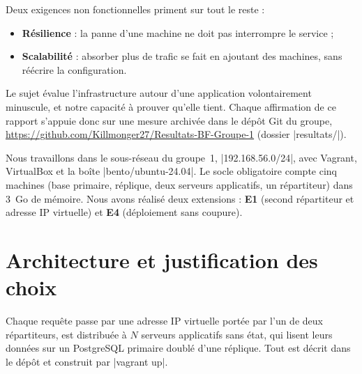 \documentclass[a4paper,11pt]{article}
\begin{document}
Deux exigences non fonctionnelles priment sur tout le reste :
\begin{itemize}
  \item \textbf{Résilience} : la panne d'une machine ne doit pas interrompre le service ;
  \item \textbf{Scalabilité} : absorber plus de trafic se fait en ajoutant des machines, sans réécrire la configuration.
\end{itemize}

Le sujet évalue l'infrastructure autour d'une application volontairement minuscule, et notre capacité à prouver qu'elle tient. Chaque affirmation de ce rapport s'appuie donc sur une mesure archivée dans le dépôt Git du groupe, \url{https://github.com/Killmonger27/Resultats-BF-Groupe-1} (dossier |resultats/|).

Nous travaillons dans le sous-réseau du groupe~1, |192.168.56.0/24|, avec Vagrant, VirtualBox et la boîte |bento/ubuntu-24.04|. Le socle obligatoire compte cinq machines (base primaire, réplique, deux serveurs applicatifs, un répartiteur) dans 3~Go de mémoire. Nous avons réalisé deux extensions : \textbf{E1} (second répartiteur et adresse IP virtuelle) et \textbf{E4} (déploiement sans coupure).

\section{Architecture et justification des choix}

Chaque requête passe par une adresse IP virtuelle portée par l'un de deux répartiteurs, est distribuée à $N$ serveurs applicatifs sans état, qui lisent leurs données sur un PostgreSQL primaire doublé d'une réplique. Tout est décrit dans le dépôt et construit par |vagrant up|.
\end{document}
